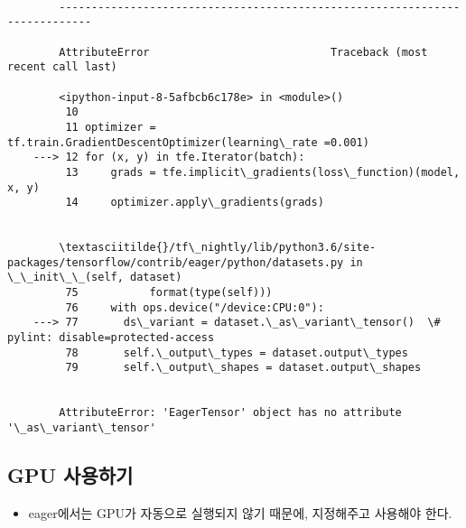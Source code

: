 \documentclass[11pt]{article}
\providecommand{\tightlist}{%
      \setlength{\itemsep}{0pt}\setlength{\parskip}{0pt}}
\begin{document}
    \begin{Verbatim}[commandchars=\\\{\}]

        ---------------------------------------------------------------------------

        AttributeError                            Traceback (most recent call last)

        <ipython-input-8-5afbcb6c178e> in <module>()
         10 
         11 optimizer = tf.train.GradientDescentOptimizer(learning\_rate =0.001)
    ---> 12 for (x, y) in tfe.Iterator(batch):
         13     grads = tfe.implicit\_gradients(loss\_function)(model, x, y)
         14     optimizer.apply\_gradients(grads)


        \textasciitilde{}/tf\_nightly/lib/python3.6/site-packages/tensorflow/contrib/eager/python/datasets.py in \_\_init\_\_(self, dataset)
         75           format(type(self)))
         76     with ops.device("/device:CPU:0"):
    ---> 77       ds\_variant = dataset.\_as\_variant\_tensor()  \# pylint: disable=protected-access
         78       self.\_output\_types = dataset.output\_types
         79       self.\_output\_shapes = dataset.output\_shapes


        AttributeError: 'EagerTensor' object has no attribute '\_as\_variant\_tensor'

    \end{Verbatim}

    \hypertarget{gpu-uxc0acuxc6a9uxd558uxae30}{%
\subsection{GPU 사용하기}\label{gpu-uxc0acuxc6a9uxd558uxae30}}

\begin{itemize}
\tightlist
\item
  eager에서는 GPU가 자동으로 실행되지 않기 때문에, 지정해주고 사용해야
  한다.
\end{itemize}
\end{document}
